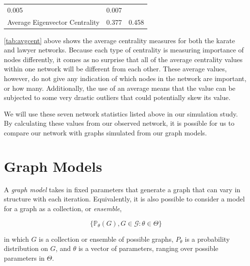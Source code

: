 \documentclass[12pt,twoside]{amherstthesis}
\begin{document}
\begin{longtable}[]{@{}lll@{}}
\begin{minipage}[t]{0.28\columnwidth}
  0.005\strut
  \end{minipage} & \begin{minipage}[t]{0.28\columnwidth}\raggedright\strut
  0.007\strut
  \end{minipage}\tabularnewline
  \begin{minipage}[t]{0.36\columnwidth}\raggedright\strut
  Average Eigenvector Centrality\strut
  \end{minipage} & \begin{minipage}[t]{0.28\columnwidth}\raggedright\strut
  0.377\strut
  \end{minipage} & \begin{minipage}[t]{0.28\columnwidth}\raggedright\strut
  0.458\strut
  \end{minipage}\tabularnewline
  \bottomrule
  \end{longtable}
  
  \autoref{tab:avgcent} above shows the average centrality measures for
  both the karate and lawyer networks. Because each type of centrality is
  measuring importance of nodes differently, it comes as no surprise that
  all of the average centrality values within one network will be
  different from each other. These average values, however, do not give
  any indication of which nodes in the network are important, or how many.
  Additionally, the use of an average means that the value can be
  subjected to some very drastic outliers that could potentially skew its
  value.
  
  We will use these seven network statistics listed above in our
  simulation study. By calculating these values from our observed network,
  it is possible for us to compare our network with graphs simulated from
  our graph models.
  
  \chapter{Graph Models}\label{graph-models}
  
  A \emph{graph model} takes in fixed parameters that generate a graph
  that can vary in structure with each iteration. Equivalently, it is also
  possible to consider a model for a graph as a collection, or
  \emph{ensemble},
  
  \[\{\mathbb{P}_{\theta}(G), G \in \mathcal{G}: \theta \in \Theta\}\]
  
  in which \(G\) is a collection or ensemble of possible graphs,
  \(P_\theta\) is a probability distribution on \(G\), and \(\theta\) is a
  vector of parameters, ranging over possible parameters in \(\Theta\).
  
\end{document}
